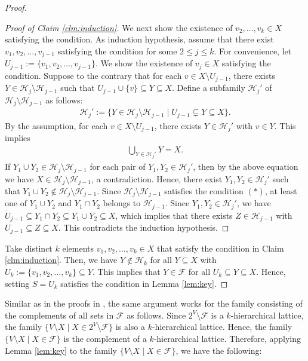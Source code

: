\documentclass[11pt,letterpaper]{article}
\theoremstyle{plain}
\theoremstyle{definition}
\begin{document}
\begin{proof}
\begin{proof}[Proof of Claim \ref{clm:induction}]
We next show the existence of $v_2,\ldots,v_k\in X$ satisfying the condition.
As induction hypothesis, assume that there exist $v_1,v_2,\ldots,v_{j-1}$ satisfying the condition for some $2\le j\le k$.
For convenience, let $U_{j-1}:=\{v_1,v_2,\ldots,v_{j-1}\}$.
We show the existence of $v_j\in X$ satisfying the condition.
Suppose to the contrary that for each $v\in X\setminus U_{j-1}$, there exists $Y\in \mathcal{H}_j\setminus \mathcal{H}_{j-1}$ such that $U_{j-1}\cup \{v\}\subseteq Y\subseteq X$.
Define a subfamily $\mathcal{H}_j'$ of $\mathcal{H}_j\setminus \mathcal{H}_{j-1}$ as follows:
\begin{align*}
\mathcal{H}_j':=\{Y\in \mathcal{H}_j\setminus \mathcal{H}_{j-1}\mid U_{j-1}\subsetneq Y\subseteq X\}.
\end{align*}
By the assumption, for each $v\in X\setminus U_{j-1}$, there exists $Y\in \mathcal{H}_j'$ with $v\in Y$.
This implies
\begin{align*}
\bigcup_{Y\in \mathcal{H}_j'}Y=X.
\end{align*}
If $Y_1\cup Y_2\in \mathcal{H}_j\setminus \mathcal{H}_{j-1}$ for each pair of $Y_1,Y_2\in \mathcal{H}_j'$, then by the above equation we have $X\in \mathcal{H}_j\setminus \mathcal{H}_{j-1}$, a contradiction.
Hence, there exist $Y_1,Y_2\in \mathcal{H}_j'$ such that $Y_1\cup Y_2\notin \mathcal{H}_j\setminus \mathcal{H}_{j-1}$.
Since $\mathcal{H}_j\setminus \mathcal{H}_{j-1}$ satisfies the condition $(*)$, at least one of $Y_1\cup Y_2$ and $Y_1\cap Y_2$ belongs to $\mathcal{H}_{j-1}$.
Since $Y_1,Y_2\in \mathcal{H}_j'$, we have $U_{j-1}\subseteq Y_1\cap Y_2\subseteq Y_1\cup Y_2\subseteq X$, which implies that there exists $Z\in \mathcal{H}_{j-1}$ with $U_{j-1}\subseteq Z\subseteq X$.
This contradicts the induction hypothesis.
\end{proof}

Take distinct $k$ elements $v_1,v_2,\ldots,v_k\in X$ that satisfy the condition in Claim \ref{clm:induction}.
Then, we have $Y\notin \mathcal{H}_k$ for all $Y\subseteq X$ with $U_k:=\{v_1,v_2,\ldots,v_k\}\subseteq Y$.
This implies that $Y\in \mathcal{F}$ for all $U_k\subseteq Y\subseteq X$.
Hence, setting $S=U_k$ satisfies the condition in Lemma \ref{lem:key}.
\end{proof}

Similar as in the proofs in \cite{goemans1995,nagele2019}, the same argument works for the family consisting of the complements of all sets in $\mathcal{F}$ as follows.
Since $2^V\setminus \mathcal{F}$ is a $k$-hierarchical lattice, the family $\{V\setminus X\mid X\in 2^V\setminus \mathcal{F}\}$ is also a $k$-hierarchical lattice.
Hence, the family $\{V\setminus X\mid X\in \mathcal{F}\}$ is the complement of a $k$-hierarchical lattice.
Therefore, applying Lemma \ref{lem:key} to the family $\{V\setminus X\mid X\in \mathcal{F}\}$, we have the following:
\end{document}
